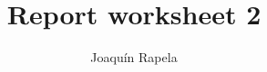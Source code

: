 \documentclass[12pt]{article}
\title{Report worksheet 2}
\author{Joaqu\'{i}n Rapela}
\def\fig_width{3.5in}
\begin{document}
\maketitle

\begin{comment}
\section*{Exercise 1: t-test for non-Gaussian distributions}

Under the null hypothesis, p-values should follow a uniform distribution (see
proof in Appendix~\ref{sec:pValuesAreUniform}). Therefore, when sampling from a
normal distribution with zero mean, we should observe
0.05*\texttt{n\_repeats}=50 tests with pvalues in the range $[p,
p+0.05],\;\forall p\in[0, 0.95]$. In particular, when sampling from a Normal
distribution with zero mean, we should observe 50 tests with p\_value\textless
0.05.

\begin{enumerate}[(a)]

    \item Here we are sampling from a normal distribution with zero mean. Thus,
        all histogram bins of length 0.05 should have around 50 counts. And
        this is what Figs.~\ref{fig:ex1a}a and~\ref{fig:ex1a}b show.

        For a probability of type I error less than 0.05, the null hypothesis
        is rejected 5\% of the time when the null hypothesis is true.

        \begin{figure}[H]
            \begin{center}
                \begin{subfigure}{0.5\textwidth}
                    \centering
                    \href{https://www.gatsby.ucl.ac.uk/~rapela/neuroinformatics/2023/ws1/figures/ex1_distributionNormal_popmean0.0000_mean0.0000_nSamples10000_withErrorBars.html}{\texttt{[image: ../figures/ex1\_distributionNormal\_popmean0.0000\_mean0.0000\_nSamples10000\_withErrorBars.png]}}
                    \caption{sample size = 10,000}
                \end{subfigure}
                \begin{subfigure}{0.5\textwidth}
                    \centering
                    \href{https://www.gatsby.ucl.ac.uk/~rapela/neuroinformatics/2023/ws1/figures/ex1_distributionNormal_popmean0.0000_mean0.0000_nSamples3_withErrorBars.html}{\texttt{[image: ../figures/ex1\_distributionNormal\_popmean0.0000\_mean0.0000\_nSamples3\_withErrorBars.png]}}
                    \caption{sample size = 3}
                \end{subfigure}


\end{comment}
\end{document}
